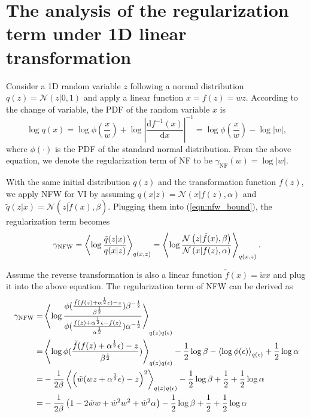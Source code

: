 \documentclass{article}
\newcommand{\expectationDist}[2]{\left\langle #1 \right\rangle _{#2}}
\newcommand{\diff}{\text{d}}
\newcommand{\gaussianDist}[3]{\mathcal{N}\left(#1|#2,#3\right)}
\newcommand{\acr}[1]{\textsc{#1}\xspace}
\newcommand{\us}{\acr{NFW}}
\begin{document}
\appendix

\section{The analysis of the regularization term under 1D linear transformation}

Consider a 1D random variable $z$ following a normal distribution $q(z) = \gaussianDist{z}{0}{1}$ and apply a linear function $x=f(z)=wz$. According to the change of variable, the PDF of the random variable $x$ is
\begin{equation}
\log q(x) = \log \phi(\frac{x}{w})+ \log \left| \frac{\diff f^{-1}(x)}{\diff x} \right|^{-1} = \log \phi(\frac{x}{w}) - \log|w|,
\end{equation}
where $\phi(\cdot)$ is the PDF of the standard normal distribution. From the above equation, we denote the regularization term of NF to be $\gamma_{\text{NF}}(w) = \log|w|$.

With the same initial distribution $q(z)$ and the transformation function $f(z)$, we apply \us for VI by assuming $q(x|z) = \gaussianDist{x}{f(z)}{\alpha}$ and $\tilde{q}(z|x) = \gaussianDist{z}{\tilde{f}(x)}{\beta}$. Plugging them into (\ref{eqn:nfw_bound}), the regularization term becomes
\begin{equation}
\gamma_{\text{\us}} = \expectationDist{\log \frac{\tilde{q}(z | x)}{q(x|z)}}{q(x,z)} = \expectationDist{\log \frac{\gaussianDist{z}{\tilde{f}(x)}{\beta}}{\gaussianDist{x}{f(z)}{\alpha}}}{q(x,z)}.
\end{equation}

Assume the reverse transformation is also a linear function $\tilde{f}(x) = \tilde{w}x$ and plug it into the above equation. The regularization term of \us can be derived as 
\begin{align*}
\gamma_{\text{\us}} =& \expectationDist{\log \frac{\phi(\frac{\tilde{f}(f(z) + \alpha^{\frac{1}{2}} \epsilon) - z}{\beta^{\frac{1}{2}}})\beta^{-\frac{1}{2}}}{\phi(\frac{f(z) + \alpha^{\frac{1}{2}} \epsilon - f(z)}{\alpha^{\frac{1}{2}}}) \alpha^{-\frac{1}{2}}}}{q(z) q(\epsilon)} \\
=& \expectationDist{\log\phi(\frac{\tilde{f}(f(z) + \alpha^{\frac{1}{2}} \epsilon) - z}{\beta^{\frac{1}{2}}})}{q(z) q(\epsilon)} - \frac{1}{2}\log \beta - \expectationDist{\log \phi(\epsilon)}{q(\epsilon)} + \frac{1}{2}\log \alpha \\
=& -\frac{1}{2\beta}\expectationDist{\left(\tilde{w}(wz + \alpha^{\frac{1}{2}} \epsilon) - z\right)^2}{q(z) q(\epsilon)} - \frac{1}{2}\log \beta +\frac{1}{2} + \frac{1}{2}\log \alpha \\
=& -\frac{1}{2\beta}\left(1 - 2\tilde{w}w  + \tilde{w}^2w^2+\tilde{w}^2\alpha\right) - \frac{1}{2}\log \beta +\frac{1}{2} + \frac{1}{2}\log \alpha
\end{align*}
\end{document}
